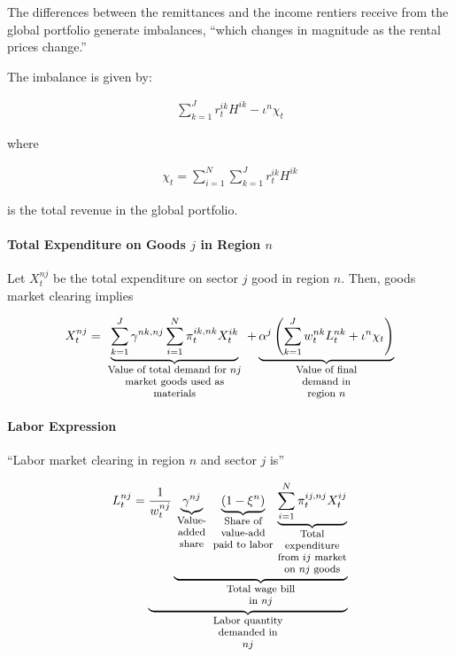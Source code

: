 \documentclass[10pt]{article}
\begin{document}
The differences between the 
remittances and the income 
rentiers receive from the global portfolio
generate imbalances, ``which changes in magnitude 
as the rental prices change.''

The imbalance is given by:

\begin{align}
    \sum_{k=1}^J r_t^{i k} H^{i k}-\iota^n \chi_t
\end{align}

where 

\begin{align}
    \chi_t=\sum_{i=1}^N \sum_{k=1}^J r_t^{i k} H^{i k}
\end{align}

is the total revenue in the global portfolio.

\paragraph{Total Expenditure on Goods $j$ in Region $n$}

Let $X_t^{n j}$ be the total expenditure on sector $j$ good in region $n$. Then, goods market clearing implies

\begin{align}
    X_t^{n j}=\underbrace{\sum_{k=1}^J \gamma^{n k, n j} \sum_{i=1}^N \pi_t^{i k, n k} X_t^{i k}}_{\parbox[t]{4cm}{\raggedright \footnotesize \centering Value of total demand for $nj$ market goods used as materials}}+
        \underbrace{\alpha^j\left(\sum_{k=1}^J w_t^{n k} L_t^{n k}+\iota^n \chi_t\right)}_{\parbox[t]{2cm}{\raggedright \footnotesize \centering Value of final demand in region $n$}}
\end{align}

\paragraph{Labor Expression}

``Labor market clearing in region $n$ and sector $j$ 
is''

\begin{align}
    L_t^{n j}=\underbrace{\frac{1}{w_t^{n j}} \underbrace{\underbrace{\gamma^{n j}}_{\parbox[t]{1cm}{\raggedright \footnotesize \centering Value-added share}}\underbrace{\left(1-\xi^n\right)}_{\parbox[t]{1.8cm}{\raggedright \footnotesize \centering Share of value-add paid to labor}} \underbrace{\sum_{i=1}^N \pi_t^{i j, n j} X_t^{i j}}_{\parbox[t]{2cm}{\raggedright \footnotesize \centering Total expenditure from $ij$ market on $nj$ goods}}}_{\parbox[t]{2cm}{\raggedright \footnotesize \centering Total wage bill in $nj$}}}_{\parbox[t]{2cm}{\raggedright \footnotesize \centering Labor quantity demanded in $nj$}}
\end{align}
\end{document}
